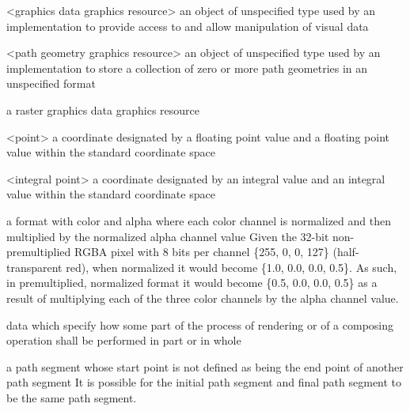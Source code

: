 <graphics data graphics resource> an object of unspecified type used by an implementation to provide access to and allow manipulation of visual data

<path geometry graphics resource> an object of unspecified type used by an implementation to store a collection of zero or more path geometries in an unspecified format

\indexdefn{\pixmap}
a raster graphics data graphics resource

<point> a coordinate designated by a floating point \xaxis{} value and a floating point \yaxis{} value within the standard coordinate space

<integral point> a coordinate designated by an integral \xaxis{} value and an integral \yaxis{} value within the standard coordinate space

a format with color and alpha where each color channel is normalized and then 
multiplied by the normalized alpha channel value
\enterexample
Given the 32-bit non-premultiplied RGBA pixel with 8 bits per channel \{255, 0, 
0, 127\} (half-transparent red), when normalized it would become \{1.0, 0.0, 
0.0, 0.5\}. As such, in premultiplied, normalized format it would become \{0.5, 
0.0, 0.0, 0.5\} as a result of multiplying each of the three color channels by 
the alpha channel value.
\exitexample

data which specify how some part of the process of rendering or of a composing operation shall be performed in part or in whole

a path segment whose start point is not defined as being the end point of another path segment
\enternote
It is possible for the initial path segment and final path segment to be the same path segment.
\exitnote

